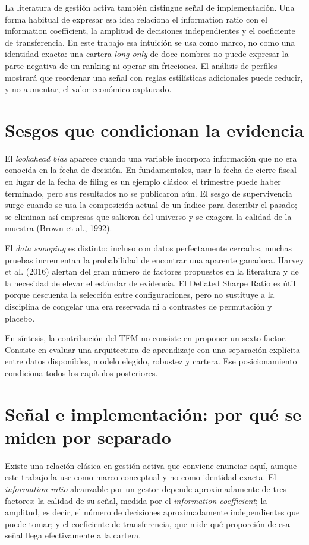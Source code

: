 La literatura de gestión activa también distingue señal de implementación. Una forma habitual de
expresar esa idea relaciona el information ratio con el information coefficient, la amplitud de
decisiones independientes y el coeficiente de transferencia. En este trabajo esa intuición se usa
como marco, no como una identidad exacta: una cartera \textit{long-only} de doce nombres no puede
expresar la parte negativa de un ranking ni operar sin fricciones. El análisis de perfiles mostrará
que reordenar una señal con reglas estilísticas adicionales puede reducir, y no aumentar, el valor
económico capturado.

\section{Sesgos que condicionan la evidencia}

El \textit{lookahead bias} aparece cuando una variable incorpora información que no era conocida en
la fecha de decisión. En fundamentales, usar la fecha de cierre fiscal en lugar de la fecha de filing
es un ejemplo clásico: el trimestre puede haber terminado, pero sus resultados no se publicaron
aún. El sesgo de supervivencia surge cuando se usa la composición actual de un índice para describir
el pasado; se eliminan así empresas que salieron del universo y se exagera la calidad de la muestra
(Brown et al., 1992).

El \textit{data snooping} es distinto: incluso con datos perfectamente cerrados, muchas pruebas
incrementan la probabilidad de encontrar una aparente ganadora. Harvey et al. (2016) alertan
del gran número de factores propuestos en la literatura y de la necesidad de elevar el estándar de
evidencia. El Deflated Sharpe Ratio es útil porque descuenta la selección entre configuraciones, pero
no sustituye a la disciplina de congelar una era reservada ni a contrastes de permutación y placebo.

En síntesis, la contribución del TFM no consiste en proponer un sexto factor. Consiste en evaluar una
arquitectura de aprendizaje con una separación explícita entre datos disponibles, modelo elegido,
robustez y cartera. Ese posicionamiento condiciona todos los capítulos posteriores.

\section{Señal e implementación: por qué se miden por separado}

Existe una relación clásica en gestión activa que conviene enunciar aquí, aunque este trabajo la use
como marco conceptual y no como identidad exacta. El \textit{information ratio} alcanzable por un
gestor depende aproximadamente de tres factores: la calidad de su señal, medida por el
\textit{information coefficient}; la amplitud, es decir, el número de decisiones aproximadamente
independientes que puede tomar; y el coeficiente de transferencia, que mide qué proporción de esa
señal llega efectivamente a la cartera.

